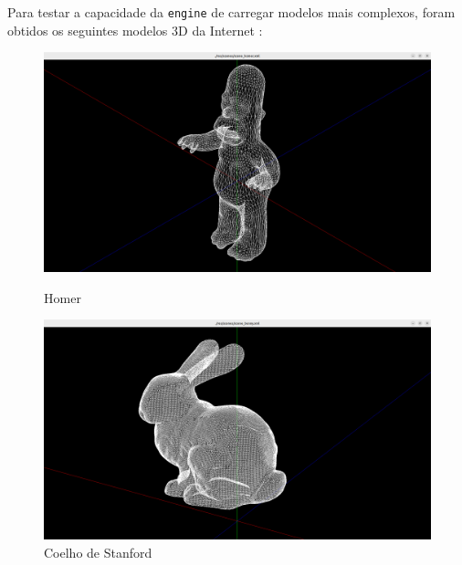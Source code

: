 \documentclass[12pt, a4paper]{article}
\begin{document}
Para testar a capacidade da \texttt{engine} de carregar modelos mais complexos, foram obtidos os
seguintes modelos 3D da Internet \cite{models}:

\begin{figure}[H]
    \centering
    \begin{minipage}{0.48\textwidth}
        \centering
        \includegraphics[width=\textwidth]{res/results/Homer.png}
        \caption{Homer}
    \end{minipage}\hfill
    \begin{minipage}{0.48\textwidth}
        \centering
        \includegraphics[width=\textwidth]{res/results/Bunny.png}
        \caption{Coelho de Stanford}
    \end{minipage}
\end{figure}
\end{document}

